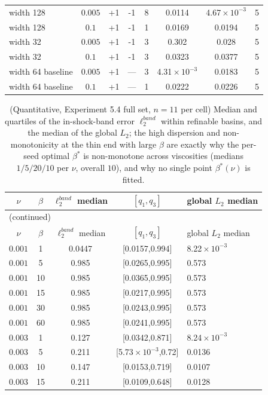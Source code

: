 \documentclass[11pt]{article}
\numberwithin{equation}{section}
\begin{document}
\begin{longtable}{lccccccc}
width 128 & $0.005$ & +1 & -1 & 8 & 0.0114 & 4.67$\!\times\!10^{-3}$ & 5 \\
width 128 & $0.1$ & +1 & -1 & 1 & 0.0169 & 0.0194 & 5 \\
width 32 & $0.005$ & +1 & -1 & 3 & 0.302 & 0.028 & 5 \\
width 32 & $0.1$ & +1 & -1 & 3 & 0.0323 & 0.0377 & 5 \\
width 64 baseline & $0.005$ & +1 & --- & 3 & 4.31$\!\times\!10^{-3}$ & 0.0183 & 5 \\
width 64 baseline & $0.1$ & +1 & --- & 1 & 0.0222 & 0.0226 & 5\\\bottomrule
\end{longtable}

\begin{longtable}{ccccl}
\caption{(Quantitative, Experiment 5.4 full set, $n=11$ per cell) Median and quartiles of the in-shock-band error $\ell_2^{band}$ within refinable basins, and the median of the global $L_2$; the high dispersion and non-monotonicity at the thin end with large $\beta$ are exactly why the per-seed optimal $\beta^*$ is non-monotone across viscosities (medians $1/5/20/10$ per $\nu$, overall $10$), and why no single point $\beta^*(\nu)$ is fitted.}\label{tab:app-e1}\\
\toprule
$\nu$ & $\beta$ & $\ell_2^{band}$ median & $[q_1,q_3]$ & global $L_2$ median\\\midrule\endfirsthead
\multicolumn{5}{l}{\small (continued)}\\\toprule
$\nu$ & $\beta$ & $\ell_2^{band}$ median & $[q_1,q_3]$ & global $L_2$ median\\\midrule\endhead
$0.001$ & 1 & 0.0447 & [0.0157,0.994] & 8.22$\!\times\!10^{-3}$ \\
$0.001$ & 5 & 0.985 & [0.0265,0.995] & 0.573 \\
$0.001$ & 10 & 0.985 & [0.0365,0.995] & 0.573 \\
$0.001$ & 15 & 0.985 & [0.0217,0.995] & 0.573 \\
$0.001$ & 30 & 0.985 & [0.0243,0.995] & 0.573 \\
$0.001$ & 60 & 0.985 & [0.0241,0.995] & 0.573 \\
$0.003$ & 1 & 0.127 & [0.0342,0.871] & 8.24$\!\times\!10^{-3}$ \\
$0.003$ & 5 & 0.211 & [5.73$\!\times\!10^{-3}$,0.72] & 0.0136 \\
$0.003$ & 10 & 0.147 & [0.0153,0.719] & 0.0107 \\
$0.003$ & 15 & 0.211 & [0.0109,0.648] & 0.0128 \\

\end{longtable}
\end{document}
